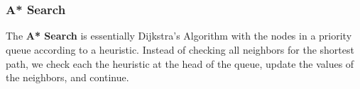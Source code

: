 \documentclass[a4paper]{article}
\theoremstyle{definition}
\begin{document}
\begin{enumerate}
\begin{figure}[H]
 ~
 ~
 
 ~
\end{figure}

\end{enumerate}
\subsubsection{A* Search}
The \textbf{A* Search} is essentially Dijkstra's Algorithm with the nodes in a priority queue according to a heuristic. Instead of checking all neighbors for the shortest path, we check each the heuristic at the head of the queue, update the values of the neighbors, and continue.
\end{document}
